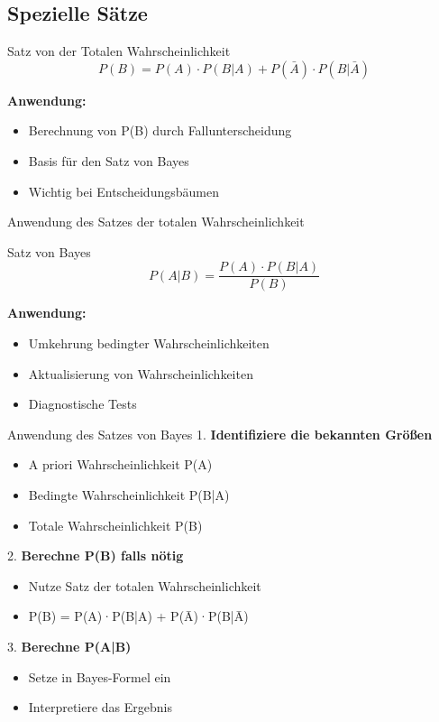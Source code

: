 \subsection{Spezielle Sätze}

\begin{theorem}{Satz von der Totalen Wahrscheinlichkeit}
$$P(B)=P(A) \cdot P(B|A)+P(\bar{A}) \cdot P(B|\bar{A})$$

\textbf{Anwendung:}
\begin{itemize}
    \item Berechnung von P(B) durch Fallunterscheidung
    \item Basis für den Satz von Bayes
    \item Wichtig bei Entscheidungsbäumen
\end{itemize}

\end{theorem}

\begin{KR}{Anwendung des Satzes der totalen Wahrscheinlichkeit}
\end{KR}

\begin{theorem}{Satz von Bayes}
$$P(A|B)=\frac{P(A) \cdot P(B|A)}{P(B)}$$

\textbf{Anwendung:}
\begin{itemize}
    \item Umkehrung bedingter Wahrscheinlichkeiten
    \item Aktualisierung von Wahrscheinlichkeiten
    \item Diagnostische Tests
\end{itemize}
\end{theorem}

\begin{KR}{Anwendung des Satzes von Bayes}
1. \textbf{Identifiziere die bekannten Größen}
   \begin{itemize}
   \item A priori Wahrscheinlichkeit P(A)
   \item Bedingte Wahrscheinlichkeit P(B|A)
   \item Totale Wahrscheinlichkeit P(B)
   \end{itemize}

2. \textbf{Berechne P(B) falls nötig}
   \begin{itemize}
   \item Nutze Satz der totalen Wahrscheinlichkeit
   \item P(B) = P(A)·P(B|A) + P(Ā)·P(B|Ā)
   \end{itemize}

3. \textbf{Berechne P(A|B)}
   \begin{itemize}
   \item Setze in Bayes-Formel ein
   \item Interpretiere das Ergebnis
   \end{itemize}
\end{KR}

